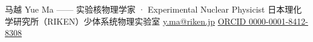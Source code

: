 \documentclass[a4paper,11pt,fontset=none]{ctexart}
\begin{document}
  {马越 Yue Ma —— 实验核物理学家 · Experimental Nuclear Physicist}
  {日本理化学研究所（RIKEN）少体系统物理实验室 \quad\textbar\quad \href{mailto:y.ma@riken.jp}{y.ma@riken.jp} \quad\textbar\quad \href{https://orcid.org/0000-0001-8412-8308}{ORCID 0000-0001-8412-8308}}


\end{document}
